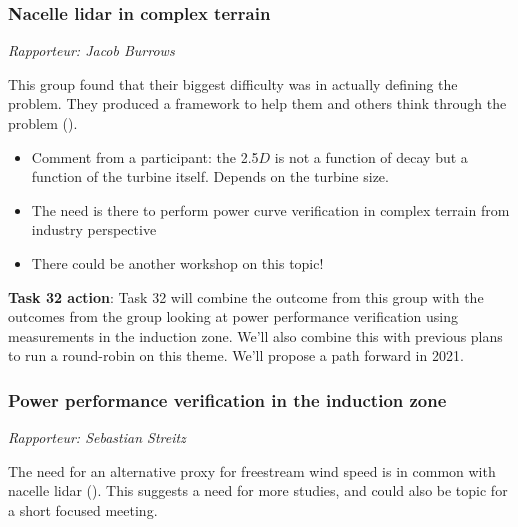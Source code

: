 \subsubsection{Nacelle lidar in complex terrain}
\emph{Rapporteur: Jacob Burrows}

This group found that their biggest difficulty was in actually defining the problem. They produced a framework to help them and others think through the problem ().


\begin{itemize}
    \item Comment from a participant: the 2.5$D$ is not a function of decay but a function of the turbine itself. Depends on the turbine size.
    \item The need is there to perform power curve verification in complex terrain from industry perspective
    \item There could be another workshop on this topic!
\end{itemize}

\begin{taskactions}
\textbf{Task 32 action}: Task 32 will combine the outcome from this group with the outcomes from the group looking at power performance verification using measurements in the induction zone. We'll also combine this with previous plans to run a round-robin on this theme. We'll propose a path forward in 2021.
\end{taskactions}

\subsubsection{Power performance verification in the induction zone}

\emph{Rapporteur: Sebastian Streitz}

The need for an alternative proxy for freestream wind speed is in common with nacelle lidar (). This suggests a need for more studies, and could also be topic for a short focused meeting.


